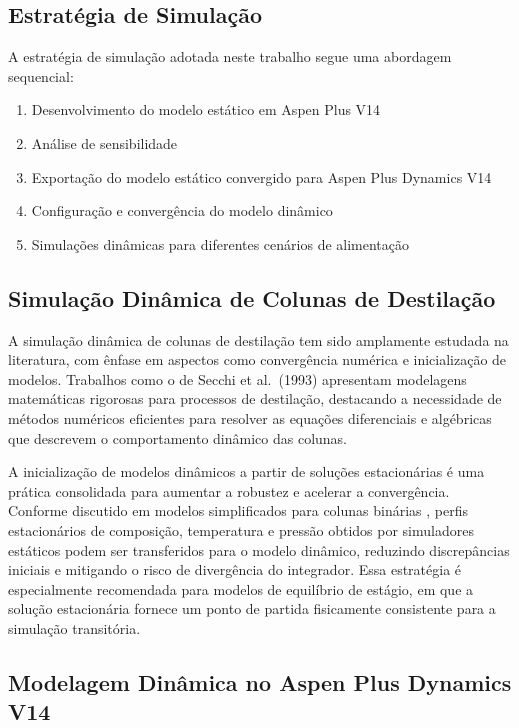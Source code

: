 \subsection{Estratégia de Simulação}

A estratégia de simulação adotada neste trabalho segue uma abordagem sequencial:

\begin{enumerate}
  \item Desenvolvimento do modelo estático em Aspen Plus V14
  \item Análise de sensibilidade 
  \item Exportação do modelo estático convergido para Aspen Plus Dynamics V14
  \item Configuração e convergência do modelo dinâmico
  \item Simulações dinâmicas para diferentes cenários de alimentação
\end{enumerate}


\subsection{Simulação Dinâmica de Colunas de Destilação}

A simulação dinâmica de colunas de destilação tem sido amplamente estudada na literatura, com ênfase em aspectos como convergência numérica e inicialização de modelos. Trabalhos como o de Secchi et al.\ (1993) \cite{secchi1993} apresentam modelagens matemáticas rigorosas para processos de destilação, destacando a necessidade de métodos numéricos eficientes para resolver as equações diferenciais e algébricas que descrevem o comportamento dinâmico das colunas.

A inicialização de modelos dinâmicos a partir de soluções estacionárias é uma prática consolidada para aumentar a robustez e acelerar a convergência. Conforme discutido em modelos simplificados para colunas binárias \cite{vieira2001}, perfis estacionários de composição, temperatura e pressão obtidos por simuladores estáticos podem ser transferidos para o modelo dinâmico, reduzindo discrepâncias iniciais e mitigando o risco de divergência do integrador. Essa estratégia é especialmente recomendada para modelos de equilíbrio de estágio, em que a solução estacionária fornece um ponto de partida fisicamente consistente para a simulação transitória.




\subsection{Modelagem Dinâmica no Aspen Plus Dynamics V14}\label{sec:modelo_dinamico}

